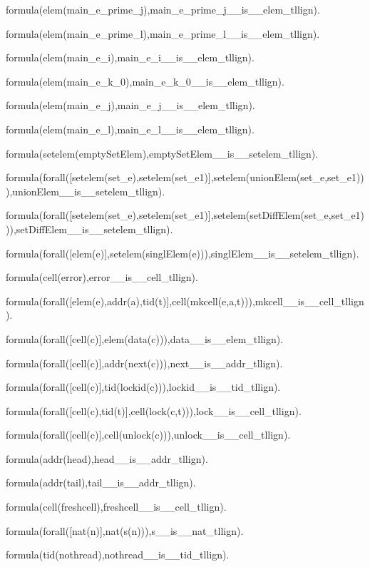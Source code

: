 formula(elem(main\_e\_prime\_j),main\_e\_prime\_j\_\_is\_\_elem\_tllign).

formula(elem(main\_e\_prime\_l),main\_e\_prime\_l\_\_is\_\_elem\_tllign).

formula(elem(main\_e\_i),main\_e\_i\_\_is\_\_elem\_tllign).

formula(elem(main\_e\_k\_0),main\_e\_k\_0\_\_is\_\_elem\_tllign).

formula(elem(main\_e\_j),main\_e\_j\_\_is\_\_elem\_tllign).

formula(elem(main\_e\_l),main\_e\_l\_\_is\_\_elem\_tllign).


formula(setelem(emptySetElem),emptySetElem\_\_is\_\_setelem\_tllign).

formula(forall([setelem(set\_e),setelem(set\_e1)],setelem(unionElem(set\_e,set\_e1))),unionElem\_\_is\_\_setelem\_tllign).

formula(forall([setelem(set\_e),setelem(set\_e1)],setelem(setDiffElem(set\_e,set\_e1))),setDiffElem\_\_is\_\_setelem\_tllign).

formula(forall([elem(e)],setelem(singlElem(e))),singlElem\_\_is\_\_setelem\_tllign).


formula(cell(error),error\_\_is\_\_cell\_tllign).

formula(forall([elem(e),addr(a),tid(t)],cell(mkcell(e,a,t))),mkcell\_\_is\_\_cell\_tllign).

formula(forall([cell(c)],elem(data(c))),data\_\_is\_\_elem\_tllign).

formula(forall([cell(c)],addr(next(c))),next\_\_is\_\_addr\_tllign).

formula(forall([cell(c)],tid(lockid(c))),lockid\_\_is\_\_tid\_tllign).

formula(forall([cell(c),tid(t)],cell(lock(c,t))),lock\_\_is\_\_cell\_tllign).

formula(forall([cell(c)],cell(unlock(c))),unlock\_\_is\_\_cell\_tllign).

formula(addr(head),head\_\_is\_\_addr\_tllign).

formula(addr(tail),tail\_\_is\_\_addr\_tllign).

formula(cell(freshcell),freshcell\_\_is\_\_cell\_tllign).


formula(forall([nat(n)],nat(s(n))),s\_\_is\_\_nat\_tllign).


formula(tid(nothread),nothread\_\_is\_\_tid\_tllign).

